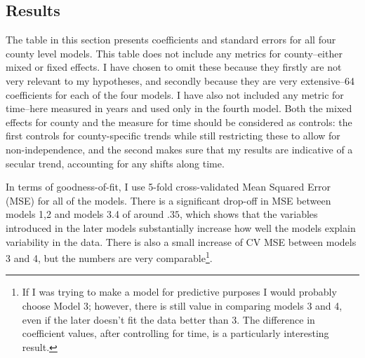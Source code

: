 \documentclass[12pt,twoside]{reedthesis}
\begin{document}
  \subsection{Results}\label{results}
  
  The table in this section presents coefficients and standard errors for
  all four county level models. This table does not include any metrics
  for county--either mixed or fixed effects. I have chosen to omit these
  because they firstly are not very relevant to my hypotheses, and
  secondly because they are very extensive--64 coefficients for each of
  the four models. I have also not included any metric for time--here
  measured in years and used only in the fourth model. Both the mixed
  effects for county and the measure for time should be considered as
  controls: the first controls for county-specific trends while still
  restricting these to allow for non-independence, and the second makes
  sure that my results are indicative of a secular trend, accounting for
  any shifts along time.
  
  In terms of goodness-of-fit, I use 5-fold cross-validated Mean Squared
  Error (MSE) for all of the models. There is a significant drop-off in
  MSE between models 1,2 and models 3.4 of around \(.35\), which shows
  that the variables introduced in the later models substantially increase
  how well the models explain variability in the data. There is also a
  small increase of CV MSE between models 3 and 4, but the numbers are
  very comparable\footnote{If I was trying to make a model for predictive
    purposes I would probably choose Model 3; however, there is still
    value in comparing models 3 and 4, even if the later doesn't fit the
    data better than 3. The difference in coefficient values, after
    controlling for time, is a particularly interesting result.}.
  
\end{document}
